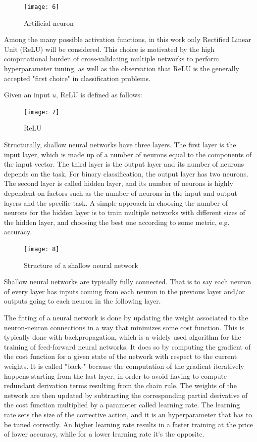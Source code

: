 \documentclass[journal,twocolumn]{IEEEtran}
\begin{document}
\begin{figure}[H]
\centering
\texttt{[image: 6]}
\caption{Artificial neuron}
\end{figure}

Among the many possible activation functions, in this work only Rectified Linear Unit (ReLU) will be considered. This choice is motivated by the high computational burden of cross-validating multiple networks to perform hyperparameter tuning, as well as the observation that ReLU is the generally accepted "first choice" in classification problems.

Given an input $u$, ReLU is defined as follows:
\begin{figure}[H]
\centering
\texttt{[image: 7]}
\caption{ReLU}
\end{figure}

Structurally, shallow neural networks have three layers. The first layer is the input layer, which is made up of a number of neurons equal to the components of the input vector. The third layer is the output layer and its number of neurons depends on the task. For binary classification, the output layer has two neurons. The second layer is called hidden layer, and its number of neurons is highly dependent on factors such as the number of neurons in the input and output layers and the specific task. A simple approach in choosing the number of neurons for the hidden layer is to train multiple networks with different sizes of the hidden layer, and choosing the best one according to some metric, e.g. accuracy.

\begin{figure}[H]
\centering
\texttt{[image: 8]}
\caption{Structure of a shallow neural network}
\end{figure}

Shallow neural networks are typically fully connected. That is to say each neuron of every layer has inputs coming from each neuron in the previous layer and/or outputs going to each neuron in the following layer.

The fitting of a neural network is done by updating the weight associated to the neuron-neuron connections in a way that minimizes some cost function. This is typically done with backpropagation, which is a widely used algorithm for the training of feed-forward neural networks. It does so by computing the gradient of the cost function for a given state of the network with respect to the current weights. It is called "back-" because the computation of the gradient iteratively happens starting from the last layer, in order to avoid having to compute redundant derivation terms resulting from the chain rule. The weights of the network are then updated by subtracting the corresponding partial derivative of the cost function multiplied by a parameter called learning rate. The learning rate sets the size of the corrective action, and it is an hyperparameter that has to be tuned correctly. An higher learning rate results in a faster training at the price of lower accuracy, while for a lower learning rate it's the opposite.
\end{document}

